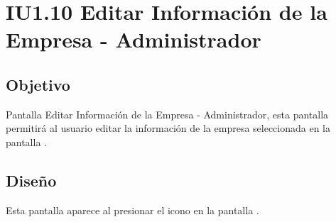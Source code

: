 \newpage
\section{IU1.10 Editar Información de la Empresa - Administrador}

\subsection{Objetivo}
	Pantalla Editar Información de la Empresa - Administrador, esta pantalla permitirá al usuario  editar la información de la empresa seleccionada en la pantalla .
	
	


\subsection{Diseño}
    Esta pantalla aparece al presionar el icono \faEdit en la pantalla .

	
